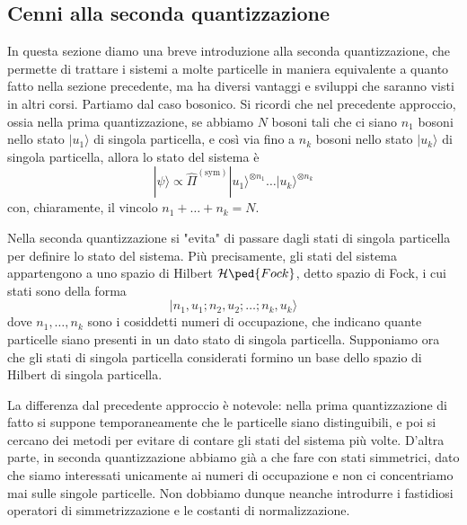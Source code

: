 \documentclass[a4paper, 11pt]{article}
\newcommand{\op}[1]{\hat{#1}}
\renewcommand{\H}{\mathcal{H}}
\renewcommand{\op}[1]{\hat{#1}}
\renewcommand{\ket}[1]{| #1\rangle}
\begin{document}
\subsection{Cenni alla seconda quantizzazione}
In questa sezione diamo una breve introduzione alla seconda quantizzazione, che permette di trattare i sistemi a molte particelle in maniera equivalente a quanto fatto nella sezione precedente, ma ha diversi vantaggi e sviluppi che saranno visti in altri corsi. Partiamo dal caso bosonico. Si ricordi che nel precedente approccio, ossia nella prima quantizzazione, se abbiamo $N$ bosoni tali che ci siano $n_1$ bosoni nello stato $\ket{u_1}$ di singola particella, e così via fino a $n_k$ bosoni nello stato $\ket{u_k}$ di singola particella, allora lo stato del sistema è 
\[\ket{\psi}\propto\op{\Pi}^{(\textrm{sym})}\ket{u_1}^{\otimes n_1}\ldots\ket{u_k}^{\otimes n_k}\]
con, chiaramente, il vincolo $n_1+\ldots+n_k=N$.

Nella seconda quantizzazione si "evita" di passare dagli stati di singola particella per definire lo stato del sistema. Più precisamente, gli stati del sistema appartengono a uno spazio di Hilbert $\H\ped{Fock}$, detto spazio di Fock, i cui stati sono della forma
\[\ket{n_1,u_1;n_2,u_2;\ldots;n_k,u_k}\]
dove $n_1,\ldots,n_k$ sono i cosiddetti numeri di occupazione, che indicano quante particelle siano presenti in un dato stato di singola particella. Supponiamo ora che gli stati di singola particella considerati formino un base dello spazio di Hilbert di singola particella.

La differenza dal precedente approccio è notevole: nella prima quantizzazione di fatto si suppone temporaneamente che le particelle siano distinguibili, e poi si cercano dei metodi per evitare di contare gli stati del sistema più volte. D'altra parte, in seconda quantizzazione abbiamo già a che fare con stati simmetrici, dato che siamo interessati unicamente ai numeri di occupazione e non ci concentriamo mai sulle singole particelle. Non dobbiamo dunque neanche introdurre i fastidiosi operatori di simmetrizzazione e le costanti di normalizzazione. 
\end{document}
